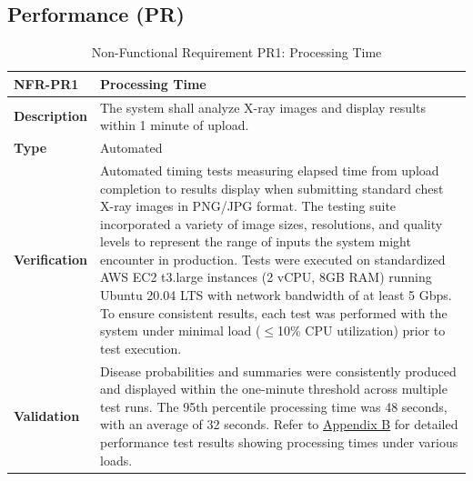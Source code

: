 \documentclass[12pt, titlepage]{article}
\begin{document}
\subsection{Performance (PR)}
\begin{table}[H]
\centering
{}
\begin{tabular}{|p{3.5cm}|p{11.5cm}|}
\hline
\rowcolor{gray!30}
\textbf{NFR-PR1} & \textbf{Processing Time} \\
\hline
\textbf{Description} & The system shall analyze X-ray images and display results within 1 minute of upload. \\
\hline
\textbf{Type} & Automated \\
\hline
\textbf{Verification} & Automated timing tests measuring elapsed time from upload completion to results display when submitting standard chest X-ray images in PNG/JPG format. The testing suite incorporated a variety of image sizes, resolutions, and quality levels to represent the range of inputs the system might encounter in production. Tests were executed on standardized AWS EC2 t3.large instances (2 vCPU, 8GB RAM) running Ubuntu 20.04 LTS with network bandwidth of at least 5 Gbps. To ensure consistent results, each test was performed with the system under minimal load ($\leq$10\% CPU utilization) prior to test execution. \\
\hline
\textbf{Validation} & Disease probabilities and summaries were consistently produced and displayed within the one-minute threshold across multiple test runs. The 95th percentile processing time was 48 seconds, with an average of 32 seconds. Refer to \hyperref[appendix:B]{Appendix B} for detailed performance test results showing processing times under various loads. \\
\hline
\end{tabular}
\caption{Non-Functional Requirement PR1: Processing Time}
\end{table}
\end{document}
